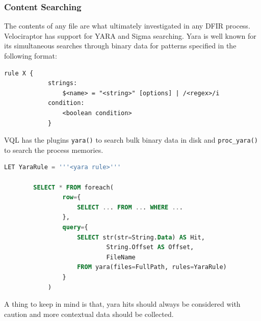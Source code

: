 \documentclass[a4paper, 11pt, oneside]{article} %
\begin{document}
\subsubsection{Content Searching}
The contents of any file are what ultimately investigated in any DFIR process. Velociraptor has support for YARA and Sigma searching. Yara is well known for its simultaneous searches through binary data for patterns specified in the following format:

\begin{lstlisting}[basicstyle=\ttfamily, breaklines=true]
        rule X {
            strings: 
                $<name> = "<string>" [options] | /<regex>/i
            condition:
                <boolean condition>
            }
\end{lstlisting}
VQL has the plugins \verb|yara()| to search bulk binary data in disk and \verb|proc_yara()| to search the process memories.
\begin{lstlisting}[basicstyle=\ttfamily, breaklines=true, language=SQL]
        LET YaraRule = '''<yara rule>'''

        SELECT * FROM foreach(
                row={
                    SELECT ... FROM ... WHERE ...
                }, 
                query={
                    SELECT str(str=String.Data) AS Hit,
                            String.Offset AS Offset,
                            FileName
                    FROM yara(files=FullPath, rules=YaraRule)
                }
            )
\end{lstlisting}
A thing to keep in mind is that, yara hits should always be considered with caution and more contextual data should be collected.
\end{document}

